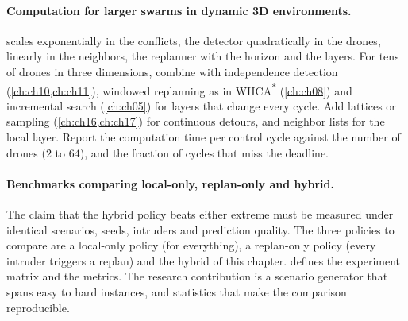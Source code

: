 \paragraph{Computation for larger swarms in dynamic 3D environments.}
\cbs scales exponentially in the conflicts, the detector quadratically in
the drones, \orca linearly in the neighbors, the replanner with the horizon
and the layers. For tens of drones in three dimensions, combine \ecbs with
independence detection (\cref{ch:ch10,ch:ch11}), windowed replanning as in
WHCA\textsuperscript{*} (\cref{ch:ch08}) and incremental search
(\cref{ch:ch05}) for layers that change every cycle. Add lattices or
sampling (\cref{ch:ch16,ch:ch17}) for continuous detours, and neighbor
lists for the local layer. Report the computation time per control cycle
against the number of drones ($2$ to $64$), and the fraction of cycles that
miss the deadline.

\paragraph{Benchmarks comparing local-only, replan-only and hybrid.}
The claim that the hybrid policy beats either extreme must be measured
under identical scenarios, seeds, intruders and prediction quality. The
three policies to compare are a local-only policy (\orca for everything), a
replan-only policy (every intruder triggers a replan) and the hybrid of this
chapter.  defines the experiment matrix and the metrics. The
research contribution is a scenario generator that spans easy to hard
instances, and statistics that make the comparison reproducible.

